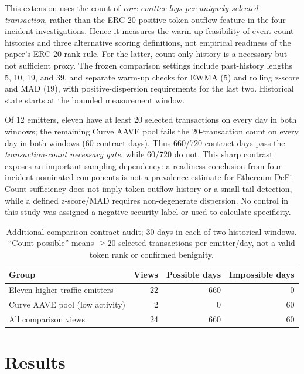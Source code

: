 \documentclass[preprint,12pt,authoryear]{elsarticle}
\begin{document}
This extension uses the count of \emph{core-emitter logs per uniquely selected transaction}, rather than the ERC-20 positive token-outflow feature in the four incident investigations. Hence it measures the warm-up feasibility of event-count histories and three alternative scoring definitions, not empirical readiness of the paper's ERC-20 rank rule. For the latter, count-only history is a necessary but not sufficient proxy. The frozen comparison settings include past-history lengths 5, 10, 19, and 39, and separate warm-up checks for EWMA (5) and rolling z-score and MAD (19), with positive-dispersion requirements for the last two. Historical state starts at the bounded measurement window.

Of 12 emitters, eleven have at least 20 selected transactions on every day in both windows; the remaining Curve AAVE pool fails the 20-transaction count on every day in both windows (60 contract-days). Thus 660/720 contract-days pass the \emph{transaction-count necessary gate}, while 60/720 do not. This sharp contrast exposes an important sampling dependency: a readiness conclusion from four incident-nominated components is not a prevalence estimate for Ethereum DeFi. Count sufficiency does not imply token-outflow history or a small-tail detection, while a defined z-score/MAD requires non-degenerate dispersion. No control in this study was assigned a negative security label or used to calculate specificity.

\begin{table}[htbp]
\centering\small
\caption{Additional comparison-contract audit; 30 days in each of two historical windows. ``Count-possible'' means $\geq20$ selected transactions per emitter/day, not a valid token rank or confirmed benignity.}
\label{tab:control}
\begin{tabularx}{\linewidth}{X r r r}
\toprule
Group & Views & Possible days & Impossible days\\
\midrule
Eleven higher-traffic emitters & 22 & 660 & 0\\
Curve AAVE pool (low activity) & 2 & 0 & 60\\
\midrule
All comparison views & 24 & 660 & 60\\
\bottomrule
\end{tabularx}
\end{table}

\section{Results}\label{sec:results}
\end{document}

